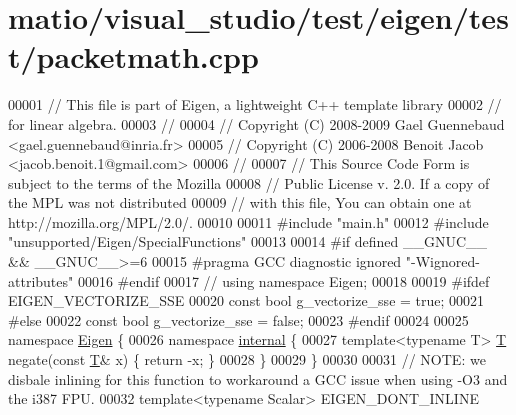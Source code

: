 \hypertarget{matio_2visual__studio_2test_2eigen_2test_2packetmath_8cpp_source}{}\section{matio/visual\+\_\+studio/test/eigen/test/packetmath.cpp}
\label{matio_2visual__studio_2test_2eigen_2test_2packetmath_8cpp_source}

\begin{DoxyCode}
00001 \textcolor{comment}{// This file is part of Eigen, a lightweight C++ template library}
00002 \textcolor{comment}{// for linear algebra.}
00003 \textcolor{comment}{//}
00004 \textcolor{comment}{// Copyright (C) 2008-2009 Gael Guennebaud <gael.guennebaud@inria.fr>}
00005 \textcolor{comment}{// Copyright (C) 2006-2008 Benoit Jacob <jacob.benoit.1@gmail.com>}
00006 \textcolor{comment}{//}
00007 \textcolor{comment}{// This Source Code Form is subject to the terms of the Mozilla}
00008 \textcolor{comment}{// Public License v. 2.0. If a copy of the MPL was not distributed}
00009 \textcolor{comment}{// with this file, You can obtain one at http://mozilla.org/MPL/2.0/.}
00010 
00011 \textcolor{preprocessor}{#include "main.h"}
00012 \textcolor{preprocessor}{#include "unsupported/Eigen/SpecialFunctions"}
00013 
00014 \textcolor{preprocessor}{#if defined \_\_GNUC\_\_ && \_\_GNUC\_\_>=6}
00015 \textcolor{preprocessor}{  #pragma GCC diagnostic ignored "-Wignored-attributes"}
00016 \textcolor{preprocessor}{#endif}
00017 \textcolor{comment}{// using namespace Eigen;}
00018 
00019 \textcolor{preprocessor}{#ifdef EIGEN\_VECTORIZE\_SSE}
00020 \textcolor{keyword}{const} \textcolor{keywordtype}{bool} g\_vectorize\_sse = \textcolor{keyword}{true};
00021 \textcolor{preprocessor}{#else}
00022 \textcolor{keyword}{const} \textcolor{keywordtype}{bool} g\_vectorize\_sse = \textcolor{keyword}{false};
00023 \textcolor{preprocessor}{#endif}
00024 
00025 \textcolor{keyword}{namespace }\hyperlink{namespace_eigen}{Eigen} \{
00026 \textcolor{keyword}{namespace }\hyperlink{namespaceinternal}{internal} \{
00027 \textcolor{keyword}{template}<\textcolor{keyword}{typename} T> \hyperlink{group___sparse_core___module}{T} negate(\textcolor{keyword}{const} \hyperlink{group___sparse_core___module}{T}& x) \{ \textcolor{keywordflow}{return} -x; \}
00028 \}
00029 \}
00030 
00031 \textcolor{comment}{// NOTE: we disbale inlining for this function to workaround a GCC issue when using -O3 and the i387 FPU.}
00032 \textcolor{keyword}{template}<\textcolor{keyword}{typename} Scalar> EIGEN\_DONT\_INLINE

\end{DoxyCode}
